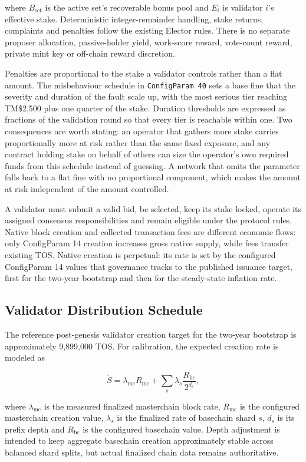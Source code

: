 \documentclass[11pt,oneside]{article}
\begin{document}
where $B_{\mathrm{set}}$ is the active set's recoverable bonus pool and $E_i$ is
validator $i$'s effective stake. Deterministic integer-remainder handling, stake returns,
complaints and penalties follow the existing Elector rules. There is no separate proposer
allocation, passive-holder yield, work-score reward, vote-count reward, private mint key or
off-chain reward discretion.

Penalties are proportional to the stake a validator controls rather than a flat amount. The
misbehaviour schedule in \texttt{ConfigParam 40} sets a base fine that the severity and
duration of the fault scale up, with the most serious tier reaching TM\$2{,}500 plus one
quarter of the stake. Duration thresholds are expressed as fractions of the validation round
so that every tier is reachable within one. Two consequences are worth stating: an operator
that gathers more stake carries proportionally more at risk rather than the same fixed
exposure, and any contract holding stake on behalf of others can size the operator's own
required funds from this schedule instead of guessing. A network that omits the parameter
falls back to a flat fine with no proportional component, which makes the amount at risk
independent of the amount controlled.

A validator must submit a valid bid, be selected, keep its stake locked, operate its assigned
consensus responsibilities and remain eligible under the protocol rules. Native block
creation and collected transaction fees are different economic flows: only ConfigParam 14
creation increases gross native supply, while fees transfer existing TOS. Native creation is
perpetual: its rate is set by the configured ConfigParam 14 values that governance tracks to
the published issuance target, first for the two-year bootstrap and then for the steady-state
inflation rate.

\subsection{Validator Distribution Schedule}

The reference post-genesis validator creation target for the two-year bootstrap is
approximately 9,899,000 TOS. For calibration, the expected creation rate is modeled as

\[
  \dot S =
  \lambda_{\mathrm{mc}}R_{\mathrm{mc}} +
  \sum_s \lambda_s\frac{R_{\mathrm{bc}}}{2^{d_s}},
\]

where $\lambda_{\mathrm{mc}}$ is the measured finalized masterchain block rate,
$R_{\mathrm{mc}}$ is the configured masterchain creation value, $\lambda_s$ is the
finalized rate of basechain shard $s$, $d_s$ is its prefix depth and $R_{\mathrm{bc}}$ is
the configured basechain value. Depth adjustment is intended to keep aggregate basechain
creation approximately stable across balanced shard splits, but actual finalized chain data
remains authoritative.
\end{document}

